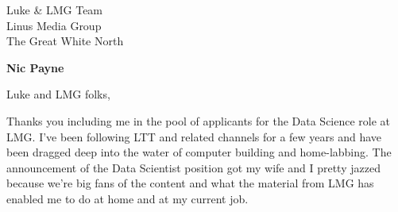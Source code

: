 \documentclass[11pt]{letter} %
\begin{document}

\begin{letter}{Luke \& LMG Team \\
Linus Media Group \\
The Great White North \\
} 


\begin{center}
\small\bf Nic Payne \\ %
\end{center} 
\vfill

\signature{Nicholas Payne} %


\opening{Luke and LMG folks,}
 

Thanks you including me in the pool of applicants for the Data Science role at LMG. 
I've been following LTT and related channels for a few years and have been dragged deep into the water of computer building and home-labbing.
The announcement of the Data Scientist position got my wife and I pretty jazzed because we're big fans of the content and what the material from LMG has enabled me to do at home and at my current job. 


\end{letter}
\end{document}
